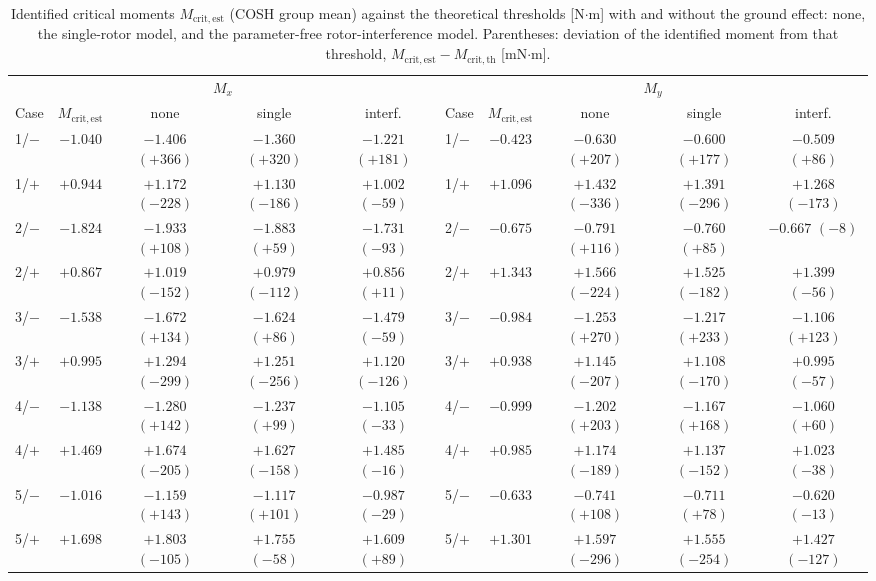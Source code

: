 \begin{table}[t]
\caption{Identified critical moments $M_{\mathrm{crit,est}}$ (COSH group mean) against the theoretical thresholds [N$\cdot$m] with and without the ground effect: none, the single-rotor model, and the parameter-free rotor-interference model. Parentheses: deviation of the identified moment from that threshold, $M_{\mathrm{crit,est}} - M_{\mathrm{crit,th}}$ [mN$\cdot$m].}
\label{tab:mcrit_ge}
\centering\small
\begin{tabular}{@{}lcccc@{\qquad}lcccc@{}}
\toprule
\multicolumn{5}{c}{$M_{x}$} & \multicolumn{5}{c}{$M_{y}$}\\
\cmidrule(r){1-5}\cmidrule(l){6-10}
Case & $M_{\mathrm{crit,est}}$ & none & single & interf. & Case & $M_{\mathrm{crit,est}}$ & none & single & interf.\\
\midrule
1/$-$ & $-1.040$ & $-1.406$ $(+366)$ & $-1.360$ $(+320)$ & $-1.221$ $(+181)$ & 1/$-$ & $-0.423$ & $-0.630$ $(+207)$ & $-0.600$ $(+177)$ & $-0.509$ $(+86)$\\
1/$+$ & $+0.944$ & $+1.172$ $(-228)$ & $+1.130$ $(-186)$ & $+1.002$ $(-59)$ & 1/$+$ & $+1.096$ & $+1.432$ $(-336)$ & $+1.391$ $(-296)$ & $+1.268$ $(-173)$\\
2/$-$ & $-1.824$ & $-1.933$ $(+108)$ & $-1.883$ $(+59)$ & $-1.731$ $(-93)$ & 2/$-$ & $-0.675$ & $-0.791$ $(+116)$ & $-0.760$ $(+85)$ & $-0.667$ $(-8)$\\
2/$+$ & $+0.867$ & $+1.019$ $(-152)$ & $+0.979$ $(-112)$ & $+0.856$ $(+11)$ & 2/$+$ & $+1.343$ & $+1.566$ $(-224)$ & $+1.525$ $(-182)$ & $+1.399$ $(-56)$\\
3/$-$ & $-1.538$ & $-1.672$ $(+134)$ & $-1.624$ $(+86)$ & $-1.479$ $(-59)$ & 3/$-$ & $-0.984$ & $-1.253$ $(+270)$ & $-1.217$ $(+233)$ & $-1.106$ $(+123)$\\
3/$+$ & $+0.995$ & $+1.294$ $(-299)$ & $+1.251$ $(-256)$ & $+1.120$ $(-126)$ & 3/$+$ & $+0.938$ & $+1.145$ $(-207)$ & $+1.108$ $(-170)$ & $+0.995$ $(-57)$\\
4/$-$ & $-1.138$ & $-1.280$ $(+142)$ & $-1.237$ $(+99)$ & $-1.105$ $(-33)$ & 4/$-$ & $-0.999$ & $-1.202$ $(+203)$ & $-1.167$ $(+168)$ & $-1.060$ $(+60)$\\
4/$+$ & $+1.469$ & $+1.674$ $(-205)$ & $+1.627$ $(-158)$ & $+1.485$ $(-16)$ & 4/$+$ & $+0.985$ & $+1.174$ $(-189)$ & $+1.137$ $(-152)$ & $+1.023$ $(-38)$\\
5/$-$ & $-1.016$ & $-1.159$ $(+143)$ & $-1.117$ $(+101)$ & $-0.987$ $(-29)$ & 5/$-$ & $-0.633$ & $-0.741$ $(+108)$ & $-0.711$ $(+78)$ & $-0.620$ $(-13)$\\
5/$+$ & $+1.698$ & $+1.803$ $(-105)$ & $+1.755$ $(-58)$ & $+1.609$ $(+89)$ & 5/$+$ & $+1.301$ & $+1.597$ $(-296)$ & $+1.555$ $(-254)$ & $+1.427$ $(-127)$\\
\bottomrule
\end{tabular}
\end{table}
